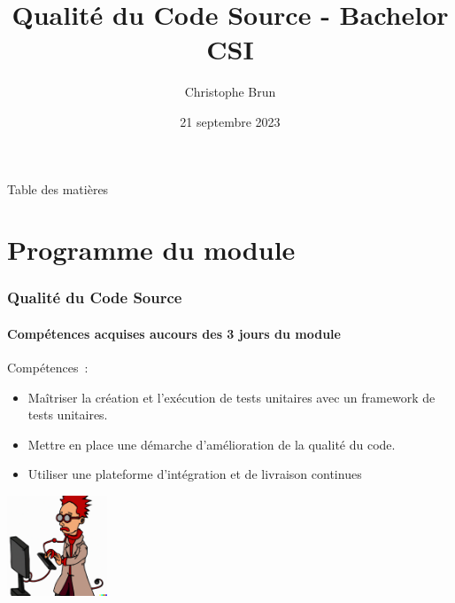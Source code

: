 \documentclass{beamer}
\title{Qualité du Code Source - Bachelor CSI}
\author{Christophe Brun}
\institute{Campus Saint-Michel IT}
\date{21 septembre 2023}
\begin{document}
    \begin{frame}
        \transdissolve
        \titlepage
    \end{frame}

    \begin{frame}{Table des matières}
        \tableofcontents
    \end{frame}


    \section{Programme du module}
    \begin{frame}
        \frametitle{Qualité du Code Source}
        \framesubtitle{Compétences acquises aucours des 3 jours du module}
        \transdissolve
        Compétences~:
        \begin{itemize}
            \item Maîtriser la création et l’exécution de tests unitaires avec un framework de tests unitaires.
            \item Mettre en place une démarche d’amélioration de la qualité du code.
            \item Utiliser une plateforme d’intégration et de livraison continues

        \end{itemize}
        \centering
        \includegraphics[width=3cm]{image/funny-cartoon-of-a-smart-young-computer-scientist.png}
    \end{frame}
\end{document}
